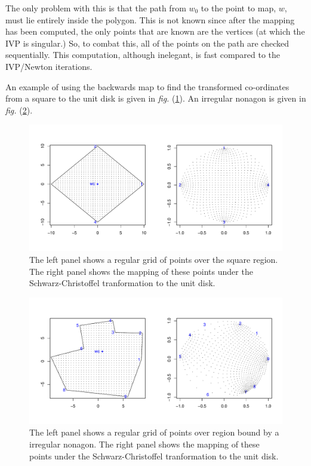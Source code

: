 \documentclass[a4paper,10pt]{amsart}
\newcommand{\sch}{Schwarz-Christoffel }
\newcommand{\fig}[1]{\emph{fig.} (\ref{#1})}
\begin{document}
The only problem with this is that the path from $w_0$ to the point to map, $w$, must lie entirely inside the polygon. This is not known since after the mapping has been computed, the only points that are known are the vertices (at which the IVP is singular.) So, to combat this, all of the points on the path are checked sequentially. This computation, although inelegant, is fast compared to the IVP/Newton iterations.

An example of using the backwards map to find the transformed co-ordinates from a square to the unit disk is given in \fig{squaredomain}. An irregular nonagon is given in \fig{irregdomain}.


\begin{figure} [bp]
\centering
\includegraphics[scale=0.5]{figs/squaredomain.pdf}
\caption{The left panel shows a regular grid of points over the square region. The right panel shows the mapping of these points under the \sch tranformation to the unit disk.}
\label{squaredomain}
\end{figure}

\begin{figure} [tbp]
\centering
\includegraphics[scale=0.5]{figs/irregulardomain.pdf}
\caption{The left panel shows a regular grid of points over region bound by a irregular nonagon. The right panel shows the mapping of these points under the \sch tranformation to the unit disk.}
\label{irregdomain}
\end{figure}
\end{document}
